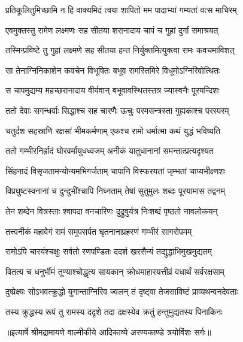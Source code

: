 \twolineshloka
{प्रतिकूलितुमिच्छामि न हि वाक्यमिदं त्वया}
{शापितो मम पादाभ्यां गम्यतां वत्स माचिरम्} %

\twolineshloka
{एवमुक्तस्तु रामेण लक्ष्मणः सह सीतया}
{शरानादाय चापं च गुहां दुर्गां समाश्रयत्} %

\twolineshloka
{तस्मिन्प्रविष्टे तु गुहां लक्ष्मणे सह सीतया}
{हन्त निर्युक्तमित्युक्त्वा रामः कवचमाविशत्} %

\twolineshloka
{सा तेनाग्निनिकाशेन कवचेन विभूषितः}
{बभूव रामस्तिमिरे विधूमोऽग्निरिवोत्थितः} %

\twolineshloka
{स चापमुद्यम्य महच्छरानादाय वीर्यवान्}
{बभूवावस्थितस्तत्र ज्यास्वनैः पूरयन्दिशः} %

\twolineshloka
{ततो देवाः सगन्धर्वाः सिद्धाश्च सह चारणैः}
{ऊचुः परमसन्त्रस्ता गुह्यकाश्च परस्परम्} %

\twolineshloka
{चतुर्दश सहस्राणि रक्षसां भीमकर्मणाम्}
{एकश्च रामो धर्मात्मा कथं युद्धं भविष्यति} %

\twolineshloka
{ततो गम्भीरनिर्ह्रादं घोरवर्मायुधध्वजम्}
{अनीकं यातुधानानां समन्तात्प्रत्यदृश्यत} %

\twolineshloka
{सिंहनादं विसृजतामन्योन्यमभिगर्जताम्}
{चापानि विस्फरयतां जृम्भतां चाप्यभीक्ष्णशः} %

\twolineshloka
{विप्रघुष्टस्वनानां च दुन्दुभींश्चापि निघ्नताम्}
{तेषां सुतुमुलः शब्दः पूरयामास तद्वनम्} %

\twolineshloka
{तेन शब्देन वित्रस्ताः श्वापदा वनचारिणः}
{दुद्रुवुर्यत्र निःशब्दं पृष्ठतो नावलोकयन्} %

\twolineshloka
{तत्त्वनीकं महावेगं रामं समुपसर्पत}
{घृतनानाप्रहरणं गम्भीरं सागरोपमम्} %

\twolineshloka
{रामोऽपि चारयंश्चक्षुः सर्वतो रणपण्डितः}
{ददर्श खरसैन्यं तद्युद्धाभिमुखमुद्यतम्} %

\twolineshloka
{वितत्य च धनुर्भीमं तूण्याश्चोद्धृत्य सायकान्}
{क्रोधमाहारयत्तीव्रं वधार्थं सर्वरक्षसाम्} %

\twolineshloka
{दुष्प्रेक्ष्यः सोऽभवत्क्रुद्धो युगान्ताग्निरिव ज्वलन्}
{तं दृष्ट्वा तेजसाविष्टं प्राव्यथन्वनदेवताः} %

\twolineshloka
{तस्य क्रुद्धस्य रूपं तु रामस्य ददृशे तदा}
{दक्षस्येव क्रतुं हन्तुमुद्यतस्य पिनाकिनः} %


{॥इत्यार्षे श्रीमद्रामायणे वाल्मीकीये आदिकाव्ये अरण्यकाण्डे त्रयोविंशः सर्गः॥}


